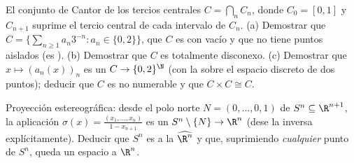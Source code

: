 \begin{exercise}[$\star\star\star$]\label{exo:b3:topology:10}
El conjunto de Cantor de los tercios centrales $C = \bigcap_n C_n$,
donde $C_0 =
[0,1]$ y $C_{n+1}$ suprime el tercio central  de cada intervalo
de $C_n$. (a) Demostrar que
$C = \bigl\{\sum_{n\geq1} a_n3^{-n} : a_n \in
\{0,2\}\bigr\}$, que $C$ es 
con  vacío y que no tiene
puntos aislados (es \emph{}).
(b) Demostrar que $C$ es totalmente disconexo. (c) Demostrar que
$x \mapsto (a_n(x))_n$ es un
 $C \to
\{0,2\}^\N$ (con la  sobre el espacio discreto de dos puntos); deducir que $C$ es
no numerable y que $C \times C
\cong C$.
\end{exercise}

\begin{exercise}[$\star\star\star$]\label{exo:b3:topology:11}
Proyección estereográfica: desde el polo norte $N = (0, \dots,
0, 1)$ de $S^n \subseteq \R^{n+1}$, la aplicación $\sigma(x) =
\frac{(x_1, \dots, x_n)}{1 - x_{n+1}}$ es un
 $S^n
\setminus \{N\} \to \R^n$ (dese la inversa explícitamente). Deducir que
$S^n$ es  a la
$\widehat{\R^n}$ y que, suprimiendo \emph{cualquier} punto de $S^n$,
queda un espacio  a
$\R^n$.
\end{exercise}

